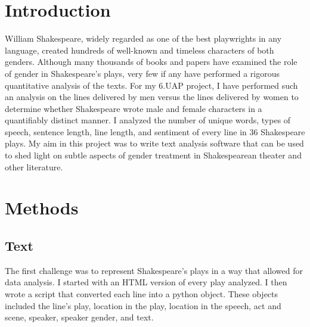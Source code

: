 \documentclass[12pt]{article} %
\begin{document}
\tableofcontents %

\newpage %


\section{Introduction} %

	William Shakespeare, widely regarded as one of the best playwrights in any language, created hundreds of well-known and timeless characters of both genders. Although many thousands of books and papers have examined the role of gender in Shakespeare’s plays, very few if any have performed a rigorous quantitative analysis of the texts. For my 6.UAP project, I have performed such an analysis on the lines delivered by men versus the lines delivered by women to determine whether Shakespeare wrote male and female characters in a quantifiably distinct manner. I analyzed the number of unique words, types of speech, sentence length, line length, and sentiment of every line in 36 Shakespeare plays. My aim in this project was to write text analysis software that can be used to shed light on subtle aspects of gender treatment in Shakespearean theater and other literature.


\section{Methods} %



\subsection{Text} %

	The first challenge was to represent Shakespeare’s plays in a way that allowed for data analysis. I started with an HTML version of every play analyzed. I then wrote a script that converted each line into a python object. These objects included the line’s play, location in the play, location in the speech, act and scene, speaker, speaker gender, and text.
\end{document}
